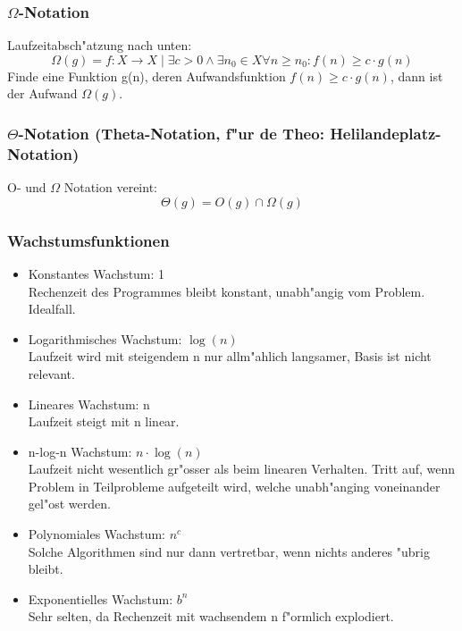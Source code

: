 \subsubsection{$\Omega$-Notation}
Laufzeitabsch"atzung nach unten: 
\begin{equation}
\Omega(g) = {f: X \rightarrow X \mid \exists c>0 \wedge \exists n_0 \in X  \forall n \geq n_0 : f(n) \geq c\cdot g(n)}
\end{equation}
Finde eine Funktion g(n), deren Aufwandsfunktion $f(n) \geq c \cdot g(n)$, dann ist der Aufwand $\Omega(g)$.

\subsubsection{$\Theta$-Notation (Theta-Notation, f"ur de Theo: Helilandeplatz-Notation)}
O- und $\Omega$ Notation vereint: 
\begin{equation}
\Theta(g)= O(g) \cap \Omega(g)
\end{equation}

\subsubsection{Wachstumsfunktionen}
\begin{itemize}
\item Konstantes Wachstum: 1\\
			Rechenzeit des Programmes bleibt konstant, unabh"angig vom Problem. Idealfall.
\item Logarithmisches Wachstum: $\log(n)$\\
			Laufzeit wird mit steigendem n nur allm"ahlich langsamer, Basis ist nicht relevant.
\item Lineares Wachstum: n\\
			Laufzeit steigt mit n linear. 
\item n-log-n Wachstum: $n\cdot \log(n)$\\
			Laufzeit nicht wesentlich gr"osser als beim linearen Verhalten. Tritt auf, wenn Problem in Teilprobleme aufgeteilt wird, welche unabh"anging voneinander gel"ost werden. 
\item Polynomiales Wachstum: $n^c$\\
			Solche Algorithmen sind nur dann vertretbar, wenn nichts anderes "ubrig bleibt.  
\item Exponentielles Wachstum: $b^n$\\
			Sehr selten, da Rechenzeit mit wachsendem n f"ormlich explodiert. 
\end{itemize}

